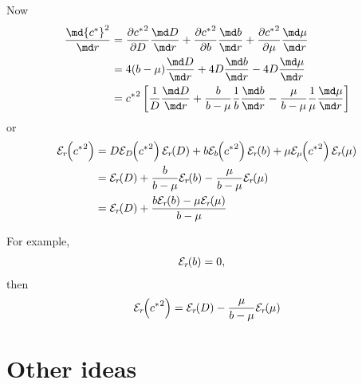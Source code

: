 \documentclass{jpmarticle}
\newcommand{\elasticity}[2]{\mathcal{E}_{#2}\negthickspace\left({#1}\right)}
\begin{document}
Now
\begin{equation}
  \begin{split}
    \frac{\md {c^*}^2}{\md r}
    &=
    \frac{\partial {c^*}^2}{\partial D} \frac{\md D}{\md r}
    + \frac{\partial {c^*}^2}{\partial b} \frac{\md b}{\md r}
    + \frac{\partial {c^*}^2}{\partial \mu} \frac{\md \mu}{\md r}
    \\
    &=
    4 (b - \mu) \frac{\md D}{\md r}
    + 4 D \frac{\md b}{\md r}
    - 4 D \frac{\md \mu}{\md r}
    \\
    &=
    {c^*}^2 \left[
      \frac{1}{D} \frac{\md D}{\md r}
      + \frac{b}{b - \mu} \frac{1}{b} \frac{\md b}{\md r}
      - \frac{\mu}{b - \mu} \frac{1}{\mu} \frac{\md \mu}{\md r}
    \right]
  \end{split}
\end{equation}
or
\begin{equation}
  \begin{split}
    \elasticity{{c^*}^2}{r}
    &=
    D \elasticity{{c^*}^2}{D} \elasticity{D}{r}
    + b \elasticity{{c^*}^2}{b} \elasticity{b}{r}
    + \mu \elasticity{{c^*}^2}{\mu} \elasticity{\mu}{r}
    \\
    &=
    \elasticity{D}{r}
    + \frac{b}{b - \mu} \elasticity{b}{r}
    - \frac{\mu}{b - \mu} \elasticity{\mu}{r}
    \\
    &=
    \elasticity{D}{r}
    + \frac{b \elasticity{b}{r}
      - \mu \elasticity{\mu}{r}}{b - \mu} 
  \end{split}
\end{equation}

For example,
\begin{align}
  \elasticity{b}{r} &= 0,
\end{align}
then
\begin{equation}
  \elasticity{{c^*}^2}{r} 
  =
  \elasticity{D}{r} - \frac{\mu}{b - \mu} \elasticity{\mu}{r}
\end{equation}

\section{Other ideas}
\end{document}
